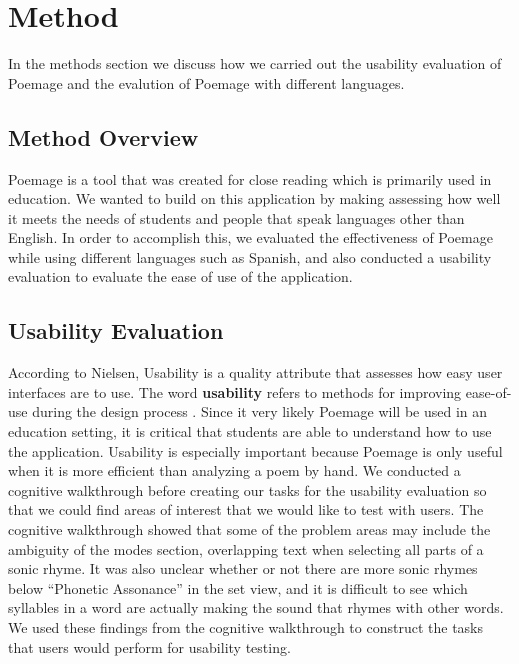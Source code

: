 \documentclass[journal]{vgtc}                %
\begin{document}
\section{Method} \label{method}
In the methods section we discuss how we carried out the usability evaluation of Poemage and the evalution of Poemage with different languages.
\subsection{Method Overview}
Poemage is a tool that was created for close reading which is primarily used in education. 
We wanted to build on this application by making assessing how well it meets the needs of students and people that speak languages other than English. 
In order to accomplish this, we evaluated the effectiveness of Poemage while using different languages such as Spanish, and also conducted a usability evaluation to evaluate the ease of use of the application. 
\subsection{Usability Evaluation}
According to Nielsen, Usability is a quality attribute that assesses how easy user interfaces are to use. 
The word \textbf{usability} refers to methods for improving ease-of-use during the design process \cite{nielson}. 
Since it very likely Poemage will be used in an education setting, it is critical that students are able to understand how to use the application. 
Usability is especially important because Poemage is only useful when it is more efficient than analyzing a poem by hand. 
We conducted a cognitive walkthrough before creating our tasks for the usability evaluation so that we could find areas of interest that we would like to test with users.\break 
\indent The cognitive walkthrough showed that some of the problem areas may include the ambiguity of the modes section, overlapping text when selecting all parts of a sonic rhyme. 
It was also unclear whether or not there are more sonic rhymes below “Phonetic Assonance” in the set view, and it is difficult to see which syllables in a word are actually making the sound that rhymes with other words. 
We used these findings from the cognitive walkthrough to construct the tasks that users would perform for usability testing. 
\end{document}
